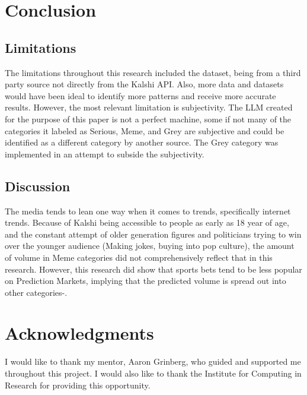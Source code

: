 \documentclass{article}
\begin{document}
\section{Conclusion}

\subsection{Limitations}
The limitations throughout this research included the dataset, being from a third party source not directly from the Kalshi API. Also, more data and datasets would have been ideal to identify more patterns and receive more accurate results. However, the most relevant limitation is subjectivity. The LLM created for the purpose of this paper is not a perfect machine, some if not many of the categories it labeled as Serious, Meme, and Grey are subjective and could be identified as a different category by another source. The Grey category was implemented in an attempt to subside the subjectivity.   
\subsection{Discussion}
The media tends to lean one way when it comes to trends, specifically internet trends. Because of Kalshi being accessible to people as early as 18 year of age, and the constant attempt of older generation figures and politicians trying to win over the younger audience (Making jokes, buying into pop culture), the amount of volume in Meme categories did not comprehensively reflect that in this research. However, this research did show that sports bets tend to be less popular on Prediction Markets, implying that the predicted volume is spread out into other categories-. 

\section{Acknowledgments}

I would like to thank my mentor, Aaron Grinberg, who guided and supported me throughout this
project. I would also like to thank the Institute for Computing in Research for providing this opportunity. 





\end{document}
